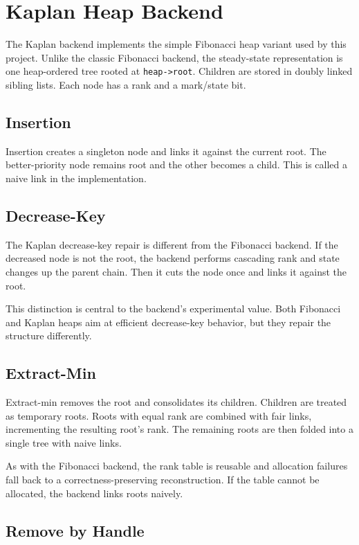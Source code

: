 \section{Kaplan Heap Backend}

The Kaplan backend implements the simple Fibonacci heap variant used by this project.
Unlike the classic Fibonacci backend, the steady-state representation is one heap-ordered tree rooted at \texttt{heap->root}.
Children are stored in doubly linked sibling lists.
Each node has a rank and a mark/state bit.

\subsection{Insertion}

Insertion creates a singleton node and links it against the current root.
The better-priority node remains root and the other becomes a child.
This is called a naive link in the implementation.

\subsection{Decrease-Key}

The Kaplan decrease-key repair is different from the Fibonacci backend.
If the decreased node is not the root, the backend performs cascading rank and state changes up the parent chain.
Then it cuts the node once and links it against the root.

This distinction is central to the backend's experimental value.
Both Fibonacci and Kaplan heaps aim at efficient decrease-key behavior, but they repair the structure differently.

\subsection{Extract-Min}

Extract-min removes the root and consolidates its children.
Children are treated as temporary roots.
Roots with equal rank are combined with fair links, incrementing the resulting root's rank.
The remaining roots are then folded into a single tree with naive links.

As with the Fibonacci backend, the rank table is reusable and allocation failures fall back to a correctness-preserving reconstruction.
If the table cannot be allocated, the backend links roots naively.

\subsection{Remove by Handle}

